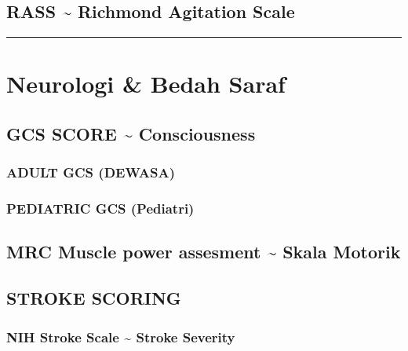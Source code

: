 \documentclass[
]{book}
\begin{document}
\hypertarget{rass-richmond-agitation-scale}{%
\subsection{RASS \textasciitilde{} Richmond Agitation Scale}\label{rass-richmond-agitation-scale}}

\begin{center}\rule{0.5\linewidth}{0.5pt}\end{center}

\hypertarget{neurologi-bedah-saraf}{%
\section{Neurologi \& Bedah Saraf}\label{neurologi-bedah-saraf}}

\hypertarget{gcs-score-consciousness}{%
\subsection{GCS SCORE \textasciitilde{} Consciousness}\label{gcs-score-consciousness}}

\hypertarget{adult-gcs-dewasa}{%
\subsubsection{ADULT GCS (DEWASA)}\label{adult-gcs-dewasa}}

\hypertarget{pediatric-gcs-pediatri}{%
\subsubsection{PEDIATRIC GCS (Pediatri)}\label{pediatric-gcs-pediatri}}

\hypertarget{mrc-muscle-power-assesment-skala-motorik}{%
\subsection{MRC Muscle power assesment \textasciitilde{} Skala Motorik}\label{mrc-muscle-power-assesment-skala-motorik}}

\hypertarget{stroke-scoring}{%
\subsection{STROKE SCORING}\label{stroke-scoring}}

\hypertarget{nih-stroke-scale-stroke-severity}{%
\subsubsection{NIH Stroke Scale \textasciitilde{} Stroke Severity}\label{nih-stroke-scale-stroke-severity}}
\end{document}
